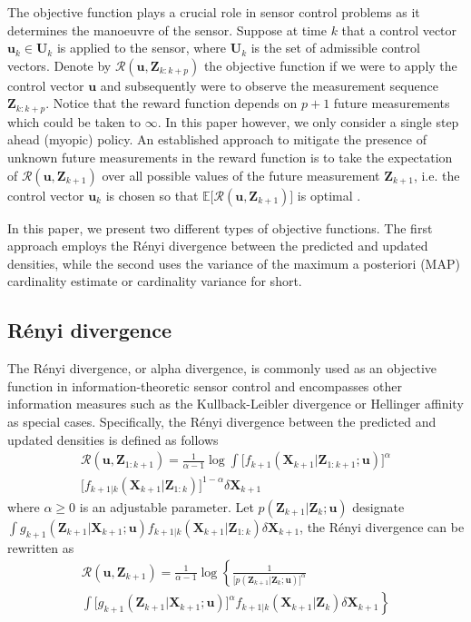 \documentclass[twocolumn]{autart}
\begin{document}
The objective function plays a crucial role in sensor control problems as it determines the
manoeuvre of the sensor. Suppose at time $k$ that a control vector $\mathbf{u}_{k}\in \mathbf{U}_{k}$
is applied to the sensor, where $\mathbf{U}_{k}$ is the set of admissible
control vectors. Denote by $\mathcal{R}(\mathbf{u},\mathbf{Z}_{k:k+p})$ the
objective function if we were to apply the control vector $\mathbf{u}$ and
subsequently were to observe the measurement sequence $\mathbf{Z}_{k:k+p}$.
Notice that the reward function depends on $p+1$ future measurements which could be taken to $\infty $. In this paper however, we only consider a single
step ahead (myopic) policy. An established approach to mitigate the presence
of unknown future measurements in the reward function is to take the
expectation of $\mathcal{R}(\mathbf{u},\mathbf{Z}_{k+1})$ over all possible
values of the future measurement $\mathbf{Z}_{k+1}$, i.e. the control vector
$\mathbf{u}_{k}$ is chosen so that $\mathbb{E}\big[\mathcal{R}(\mathbf{u},\mathbf{Z}_{k+1})\big]$ is optimal \cite{Mah04,RV10,RVC11}.

In this paper, we present two different types of objective functions. The first approach employs the R\'{e}nyi divergence between the predicted and updated densities, while the second
uses the variance of the maximum a posteriori (MAP) cardinality estimate or
cardinality variance for short.

\subsection{R\'enyi divergence}

The R\'{e}nyi divergence, or alpha divergence, is commonly used as an objective
function in information-theoretic sensor control \cite{RV10,RVC11,HKB08} and encompasses other
information measures such as the Kullback-Leibler divergence or Hellinger
affinity as special cases. Specifically, the R\'{e}nyi divergence between
the predicted and updated densities is defined as follows \cite{HKB08}
\begin{multline}\label{RD}
\mathcal{R}(\mathbf{u},\mathbf{Z}_{1:k+1})=\frac{1}{\alpha -1}\log\int\big[f_{k+1}(\mathbf{X}_{k+1}|\mathbf{Z}_{1:k+1};\mathbf{u})\big]^\alpha\\
[f_{k+1|k}(\mathbf{X}_{k+1}|\mathbf{Z}_{1:k})\big]^{1-\alpha}\delta\mathbf{X}_{k+1}
\end{multline}
where $\alpha \geq 0$ is an adjustable parameter. Let $p(\mathbf{Z}_{k+1}|\mathbf{Z}_k;\mathbf{u})$ designate $\int g_{k+1}(\mathbf{Z}_{k+1}|\mathbf{X}_{k+1};\mathbf{u})f_{k+1|k}(\mathbf{X}_{k+1}|\mathbf{Z}_{1:k})\delta\mathbf{X}_{k+1}$, the R\'{e}nyi divergence can be rewritten as \cite {RV10}
\begin{multline}
\mathcal{R}(\mathbf{u},\mathbf{Z}_{k+1})=\frac{1}{\alpha -1}\log \left\{
\frac{1}{\big[p(\mathbf{Z}_{k+1}|\mathbf{Z}_{k};\mathbf{u})\big]^{\alpha }}\right.   \label{RD_fin} \\
\left. \int \big[g_{k+1}(\mathbf{Z}_{k+1}|\mathbf{X}_{k+1};\mathbf{u})\big]^{\alpha }f_{k+1|k}(\mathbf{X}_{k+1}|\mathbf{Z}_{k})\delta \mathbf{X}_{k+1}\right\}
\end{multline}
\end{document}

